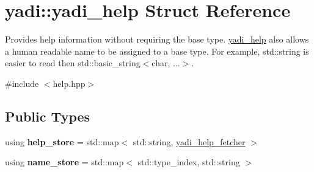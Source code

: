 \hypertarget{structyadi_1_1yadi__help}{}\section{yadi\+:\+:yadi\+\_\+help Struct Reference}
\label{structyadi_1_1yadi__help}


Provides help information without requiring the base type. \hyperlink{structyadi_1_1yadi__help}{yadi\+\_\+help} also allows a human readable name to be assigned to a base type. For example, std\+::string is easier to read then std\+::basic\+\_\+string$<$char, ...$>$.  




{\ttfamily \#include $<$help.\+hpp$>$}

\subsection*{Public Types}
\begin{DoxyCompactItemize}
\item 
\mbox{\label{structyadi_1_1yadi__help_a75ac18a2704307f2b4acddb4e45f66d5}} 
using {\bfseries help\+\_\+store} = std\+::map$<$ std\+::string, \hyperlink{structyadi_1_1yadi__help__fetcher}{yadi\+\_\+help\+\_\+fetcher} $>$
\item 
\mbox{\label{structyadi_1_1yadi__help_aaa85b3a9116a8dd35a91db333576bf59}} 
using {\bfseries name\+\_\+store} = std\+::map$<$ std\+::type\+\_\+index, std\+::string $>$
\end{DoxyCompactItemize}
